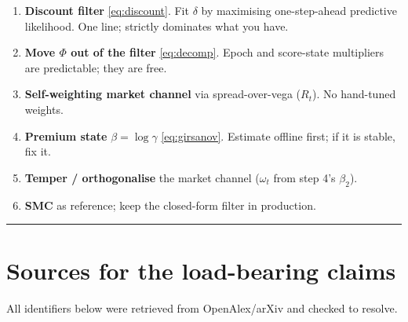\documentclass[11pt,a4paper]{article}
\theoremstyle{plain}
\begin{document}
\begin{enumerate}
\item \textbf{Discount filter} \eqref{eq:discount}. Fit $\delta$ by maximising one-step-ahead
      predictive likelihood. One line; strictly dominates what you have.
\item \textbf{Move $\Phi$ out of the filter} \eqref{eq:decomp}. Epoch and score-state multipliers
      are predictable; they are free.
\item \textbf{Self-weighting market channel} via spread-over-vega ($R_t$). No hand-tuned weights.
\item \textbf{Premium state} $\beta = \log\gamma$ \eqref{eq:girsanov}. Estimate offline first;
      if it is stable, fix it.
\item \textbf{Temper / orthogonalise} the market channel ($\omega_t$ from step 4's $\beta_2$).
\item \textbf{SMC} as reference; keep the closed-form filter in production.
\end{enumerate}

\vspace{0.4cm}
\begin{center}\rule{\textwidth}{0.4pt}\end{center}

\section*{Sources for the load-bearing claims}
\footnotesize
\sloppy
All identifiers below were retrieved from OpenAlex/arXiv and checked to resolve.
\end{document}
